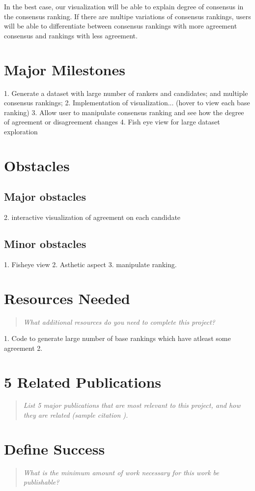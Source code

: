 \documentclass{proc}
\begin{document}
In the best case, our visualization will be able to explain degree of consensus in the consensus ranking. If there are multipe variations of consensus rankings, users will be able to differentiate between consensus rankings with more agreement consensus and rankings with less agreement.

\section{Major Milestones}

1. Generate a dataset with large number of rankers and candidates; and multiple consensus rankings;
2. Implementation of visualization... (hover to view each base ranking)
3. Allow user to manipulate consensus ranking and see how the degree of agreement or disagreement changes
4. Fish eye view for large dataset exploration

\section{Obstacles}

\subsection{Major obstacles} %
2. interactive visualization of agreement on each candidate

\subsection{Minor obstacles}
1. Fisheye view
2. Asthetic aspect
3. manipulate ranking.

\section{Resources Needed}
\begin{quote}
\textit{What additional resources do you need to complete this project?}
\end{quote}

1. Code to generate large number of base rankings which have atleast some agreement 
2. 

\section{5 Related Publications}
\begin{quote}
\textit{List 5 major publications that are most relevant to this project, and how they are related (sample citation \cite{wijk2005value}).}
\end{quote}

\section{Define Success}
\begin{quote}
\textit{What is the minimum amount of work necessary for this work be publishable?}
\end{quote}



\end{document}

